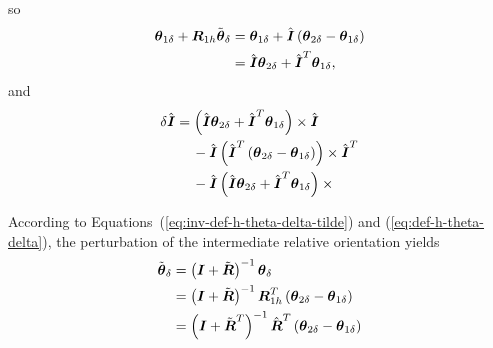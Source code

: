 \documentclass[10pt,dvips,fleqn]{report}
\newcommand{\T}[1]{\boldsymbol{#1}}
\begin{document}
so
\begin{align}
	\T{\theta}_{1\delta}
	+ \T{R}_{1h} \tilde{\T{\theta}}_{\delta}
	&= \T{\theta}_{1\delta} + \hat{\T{I}} \plbr{
		\T{\theta}_{2\delta} - \T{\theta}_{1\delta}
	} \\
	&= \hat{\T{I}} \T{\theta}_{2\delta}
	+ \hat{\T{I}}^T \T{\theta}_{1\delta} ,
\end{align}
and
\begin{align}
	\delta\hat{\T{I}} &= \plbr{
		\hat{\T{I}} \T{\theta}_{2\delta}
		+ \hat{\T{I}}^T \T{\theta}_{1\delta}
	} \times \hat{\T{I}}
	\nonumber \\
	& \mbox{\hspace{12pt}}
	- \hat{\T{I}} \plbr{
		\hat{\T{I}}^T \plbr{
			\T{\theta}_{2\delta}
			- \T{\theta}_{1\delta}
		}
	} \times \hat{\T{I}}^T
	\nonumber \\
	& \mbox{\hspace{12pt}}
	- \hat{\T{I}} \plbr{
		\hat{\T{I}} \T{\theta}_{2\delta}
		+ \hat{\T{I}}^T \T{\theta}_{1\delta}
	}\times{}
\end{align}

According to Equations~(\ref{eq:inv-def-h-theta-delta-tilde})
and (\ref{eq:def-h-theta-delta}),
the perturbation of the intermediate relative orientation yields
\begin{align}
	\tilde{\T{\theta}}_{\delta}
	&= \plbr{\T{I} + \tilde{\T{R}}}^{-1} \T{\theta}_{\delta} \\
	&= \plbr{\T{I} + \tilde{\T{R}}}^{-1}
		\T{R}_{1h}^T\plbr{\T{\theta}_{2\delta} - \T{\theta}_{1\delta}} \\
	&= \plbr{\T{I} + \tilde{\T{R}}^T}^{-1}
		\hat{\T{R}}^T\plbr{\T{\theta}_{2\delta} - \T{\theta}_{1\delta}}
\end{align}
\end{document}
